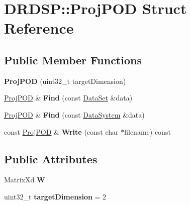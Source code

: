 \hypertarget{struct_d_r_d_s_p_1_1_proj_p_o_d}{\section{D\-R\-D\-S\-P\-:\-:Proj\-P\-O\-D Struct Reference}
\label{struct_d_r_d_s_p_1_1_proj_p_o_d}
}
\subsection*{Public Member Functions}
\begin{DoxyCompactItemize}
\item 
\hypertarget{struct_d_r_d_s_p_1_1_proj_p_o_d_aca597efa4efe8a9f3632b4648ab3bee6}{{\bfseries Proj\-P\-O\-D} (uint32\-\_\-t target\-Dimension)}\label{struct_d_r_d_s_p_1_1_proj_p_o_d_aca597efa4efe8a9f3632b4648ab3bee6}

\item 
\hypertarget{struct_d_r_d_s_p_1_1_proj_p_o_d_ad852a4b068691732d2be2b0fc6a50fef}{\hyperlink{struct_d_r_d_s_p_1_1_proj_p_o_d}{Proj\-P\-O\-D} \& {\bfseries Find} (const \hyperlink{struct_d_r_d_s_p_1_1_data_set}{Data\-Set} \&data)}\label{struct_d_r_d_s_p_1_1_proj_p_o_d_ad852a4b068691732d2be2b0fc6a50fef}

\item 
\hypertarget{struct_d_r_d_s_p_1_1_proj_p_o_d_a00d7aa64d9f4c3e396bb37aa2e493747}{\hyperlink{struct_d_r_d_s_p_1_1_proj_p_o_d}{Proj\-P\-O\-D} \& {\bfseries Find} (const \hyperlink{struct_d_r_d_s_p_1_1_data_system}{Data\-System} \&data)}\label{struct_d_r_d_s_p_1_1_proj_p_o_d_a00d7aa64d9f4c3e396bb37aa2e493747}

\item 
\hypertarget{struct_d_r_d_s_p_1_1_proj_p_o_d_a01949683f073d757884e0dc86f9fe26d}{const \hyperlink{struct_d_r_d_s_p_1_1_proj_p_o_d}{Proj\-P\-O\-D} \& {\bfseries Write} (const char $\ast$filename) const }\label{struct_d_r_d_s_p_1_1_proj_p_o_d_a01949683f073d757884e0dc86f9fe26d}

\end{DoxyCompactItemize}
\subsection*{Public Attributes}
\begin{DoxyCompactItemize}
\item 
\hypertarget{struct_d_r_d_s_p_1_1_proj_p_o_d_accfcb1fe9ae69a35a85d74732a04c9c7}{Matrix\-Xd {\bfseries W}}\label{struct_d_r_d_s_p_1_1_proj_p_o_d_accfcb1fe9ae69a35a85d74732a04c9c7}

\item 
\hypertarget{struct_d_r_d_s_p_1_1_proj_p_o_d_acdfe762ff68aa2be10d16797312a8215}{uint32\-\_\-t {\bfseries target\-Dimension} = 2}\label{struct_d_r_d_s_p_1_1_proj_p_o_d_acdfe762ff68aa2be10d16797312a8215}

\end{DoxyCompactItemize}
